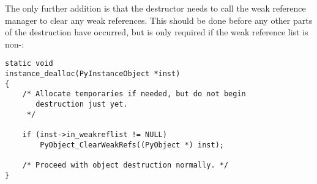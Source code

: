The only further addition is that the destructor needs to call the
weak reference manager to clear any weak references.  This should be
done before any other parts of the destruction have occurred, but is
only required if the weak reference list is non-\NULL:

\begin{verbatim}
static void
instance_dealloc(PyInstanceObject *inst)
{
    /* Allocate temporaries if needed, but do not begin
       destruction just yet.
     */

    if (inst->in_weakreflist != NULL)
        PyObject_ClearWeakRefs((PyObject *) inst);

    /* Proceed with object destruction normally. */
}
\end{verbatim}
